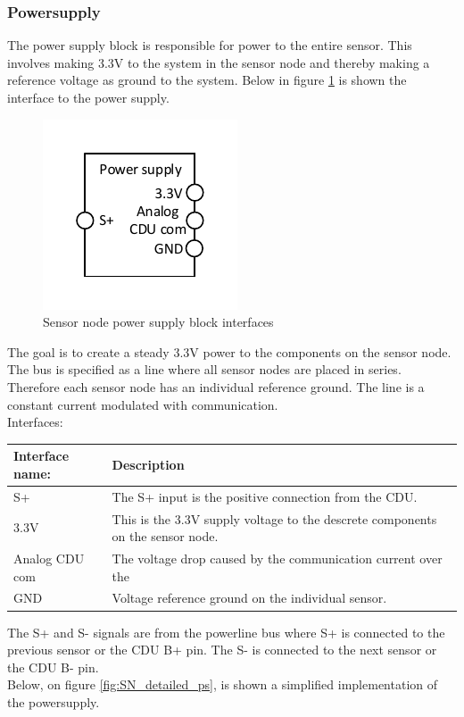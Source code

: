 \subsubsection{Powersupply}
The power supply block is responsible for power to the entire sensor. This involves making 3.3V to the system in the sensor node and thereby making a reference voltage as ground to the system. Below in figure \ref{fig:SN_PS_FIGURE} is shown the interface to the power supply.

\begin{figure}[H]
	\centering
	\includegraphics[width=.4\textwidth]{billeder/sn_powersupply_figure}
	\caption{Sensor node power supply block interfaces}
	\label{fig:SN_PS_FIGURE}
\end{figure} 

The goal is to create a steady 3.3V power to the components on the sensor node. The bus is specified as a line where all sensor nodes are placed in series. Therefore each sensor node has an individual reference ground. The line is a constant current modulated with communication.\\
Interfaces:
\begin{table}[H]
	\centering
	\begin{tabular}{|p{3cm} | p{8cm}| }
		\hline
		Interface name: 	& Description \\ \hline
		S+ 				& The S+ input is the positive connection from the CDU. \\ \hline
		3.3V			& This is the 3.3V supply voltage to the descrete components on the sensor node. \\ 	\hline
		Analog CDU com  & The voltage drop caused by the communication current over the \\ \hline
		GND				& Voltage reference ground on the individual sensor.\\\hline 
	\end{tabular}
\end{table}

The S+ and S- signals are from the powerline bus where S+ is connected to the previous sensor or the CDU B+ pin. The S- is connected to the next sensor or the CDU B- pin.\\
Below, on figure \ref{fig:SN_detailed_ps}, is shown a simplified implementation of the powersupply.

